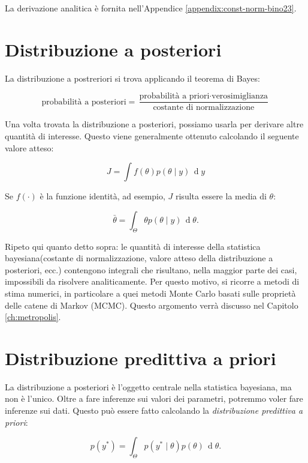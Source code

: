 \documentclass[
  11pt,
]{krantz}
\theoremstyle{definition}
\theoremstyle{definition}
\theoremstyle{definition}
\theoremstyle{definition}
\theoremstyle{remark}
\begin{document}
La derivazione analitica è fornita nell'Appendice \ref{appendix:const-norm-bino23}.

\hypertarget{distribuzione-a-posteriori}{%
\section{Distribuzione a posteriori}\label{distribuzione-a-posteriori}}

La distribuzione a postreriori si trova applicando il teorema di Bayes:

\[
\text{probabilità a posteriori} = \frac{\text{probabilità a priori} \cdot \text{verosimiglianza}}{\text{costante di normalizzazione}}
\]

Una volta trovata la distribuzione a posteriori, possiamo usarla per derivare altre quantità di interesse. Questo viene generalmente ottenuto calcolando il seguente valore atteso:

\[
J = \int f(\theta) p(\theta \mid y) \,\operatorname {d}\!y
\]

Se \(f(\cdot)\) è la funzione identità, ad esempio, \(J\) risulta essere la media di \(\theta\):

\[
\bar{\theta} = \int_{\Theta} \theta p(\theta \mid y) \,\operatorname {d}\!\theta .
\]

Ripeto qui quanto detto sopra: le quantità di interesse della statistica bayesiana(costante di normalizzazione, valore atteso della distribuzione a posteriori, ecc.) contengono integrali che risultano, nella maggior parte dei casi, impossibili da risolvere analiticamente. Per questo motivo, si ricorre a metodi di stima numerici, in particolare a quei metodi Monte Carlo basati sulle proprietà delle catene di Markov (MCMC). Questo argomento verrà discusso nel Capitolo \ref{ch:metropolis}.

\hypertarget{distribuzione-predittiva-a-priori}{%
\section{Distribuzione predittiva a priori}\label{distribuzione-predittiva-a-priori}}

La distribuzione a posteriori è l'oggetto centrale nella statistica bayesiana, ma non è l'unico. Oltre a fare inferenze sui valori dei parametri, potremmo voler fare inferenze sui dati. Questo può essere fatto calcolando la \emph{distribuzione predittiva a priori}:

\begin{equation}
p(y^*) = \int_\Theta p(y^* \mid \theta) p(\theta) \,\operatorname {d}\!\theta .
\label{eq:prior-pred-distr}
\end{equation}
\end{document}
